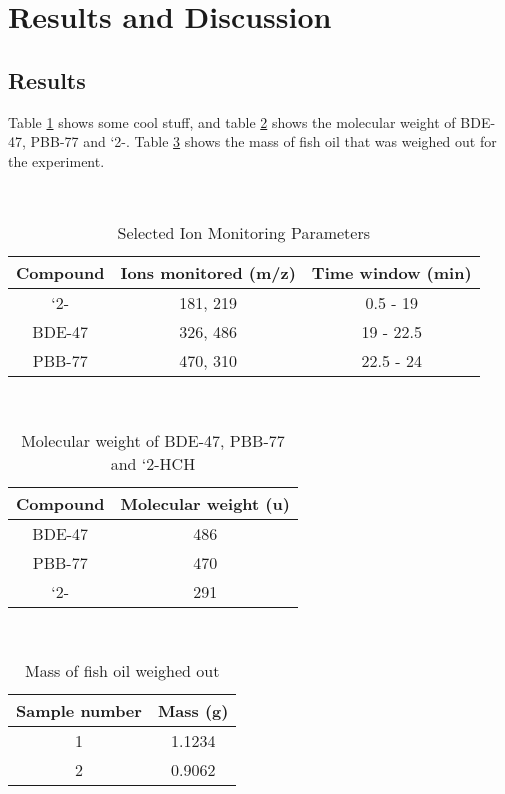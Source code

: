 \documentclass[a4paper, 12pt]{article}
\begin{document}

\section{Results and Discussion}

\subsection{Results}
Table \ref{tab-para} shows some cool stuff, and table \ref{tab-mass} shows the molecular weight of BDE-47, PBB-77 and `2-. Table \ref{tab-fish} shows the mass of fish oil that was weighed out for the experiment.

\begin{table}[h!]
	\centering
	\caption{Selected Ion Monitoring Parameters}
	\hfill \\
	\begin{tabular}{|c|c|c|}
		\hline
		Compound & Ions monitored (m/z) & Time window (min) \\
		\hline
		`2-\ce{HCH} & 181, 219 & 0.5 - 19 \\
		\hline
		BDE-47 & 326, 486 & 19 - 22.5 \\
		\hline
		PBB-77 & 470, 310 & 22.5 - 24 \\
		\hline
	\end{tabular}
	\label{tab-para}
\end{table}

\begin{table}[h!]
	\centering
	\caption{Molecular weight of BDE-47, PBB-77 and `2-HCH}
	\hfill \\
	\begin{tabular}{|c|c|}
		\hline
		Compound & Molecular weight (\si{\amu}) \\
		\hline
		BDE-47 & 486 \\
		\hline
		PBB-77 & 470 \\
		\hline
		`2-\ce{HCH} & 291 \\
		\hline
	\end{tabular}
	\label{tab-mass}
\end{table}

\begin{table}[h!]
	\centering
	\caption{Mass of fish oil weighed out}
	\hfill \\
	\begin{tabular}{|c|c|}
		\hline
		Sample number & Mass (\si{\gram}) \\
		\hline
		1 & 1.1234 \\
		\hline
		2 & 0.9062 \\
		\hline
	\end{tabular}
	\label{tab-fish}
\end{table}
\end{document}
